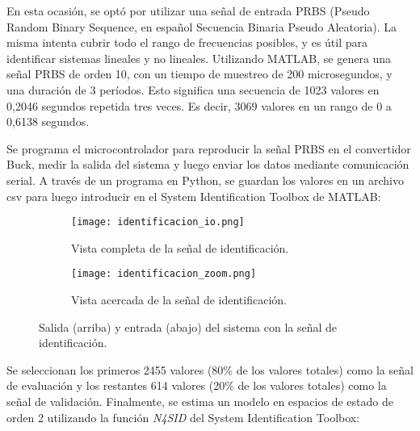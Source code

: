 En esta ocasión, se optó por utilizar una señal de entrada PRBS
(Pseudo Random Binary Sequence, en español Secuencia Binaria Pseudo Aleatoria). La misma intenta
cubrir todo el rango de frecuencias posibles, y es útil para identificar sistemas lineales y no lineales.
Utilizando MATLAB, se genera una señal PRBS de orden 10, con un tiempo de muestreo de 200 microsegundos,
y una duración de 3 períodos. Esto significa una secuencia de 1023 valores en 0,2046 segundos repetida tres veces.
Es decir, 3069 valores en un rango de 0 a 0,6138 segundos.

Se programa el microcontrolador para reproducir la señal PRBS en el convertidor Buck, medir la salida
del sistema y luego enviar los datos mediante comunicación serial. A través de un programa en Python, se guardan
los valores en un archivo csv para luego introducir en el System Identification Toolbox de MATLAB:


\begin{figure}[H]
    \centering

    \begin{subfigure}[b]{\textwidth}
        \centering
        \texttt{[image: identificacion\_io.png]}
        \caption{Vista completa de la señal de identificación.}
        \label{fig:identificacion_io_gral}
    \end{subfigure}
    \begin{subfigure}[b]{\textwidth}
        \centering
        \texttt{[image: identificacion\_zoom.png]}
        \caption{Vista acercada de la señal de identificación.}
        \label{fig:identificacion_io_zoom}
    \end{subfigure}

    \vspace{-0.25cm}
    \caption{Salida (arriba) y entrada (abajo) del sistema con la señal de identificación.}
    \label{fig:identificacion_io}
\end{figure}
\vspace{-0.5cm}

Se seleccionan los primeros 2455 valores (80\% de los valores totales) como la señal de evaluación
y los restantes 614 valores (20\% de los valores totales) como la señal de validación. Finalmente,
se estima un modelo en espacios de estado de orden 2 utilizando la función \textit{N4SID} del System Identification Toolbox:

